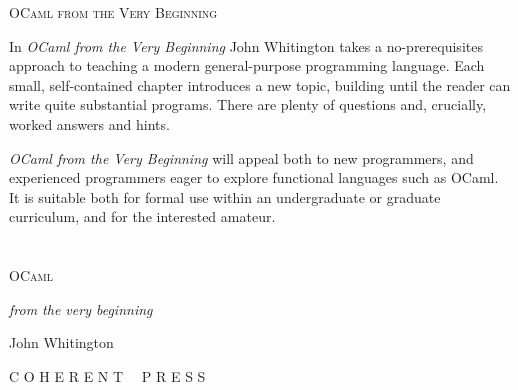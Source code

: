 \documentclass[]{book}
\begin{document}
\frontmatter

\thispagestyle{empty}

{\Large\scshape OCaml from the Very Beginning}

\vspace{16mm}

\begin{minipage}{5in}
\setlength{\parindent}{25pt}
\noindent In \textit{OCaml from the Very Beginning} John Whitington takes a no-prerequisites approach to teaching a modern general-purpose programming language. Each small, self-contained chapter introduces a new topic, building until the reader can write quite substantial programs. There are plenty of questions and, crucially, worked answers and hints.

\textit{OCaml from the Very Beginning} will appeal both to new programmers, and experienced programmers eager to explore functional languages such as OCaml. It is suitable both for formal use within an undergraduate or graduate curriculum, and for the interested amateur.

\vspace{8mm}

\end{minipage}


\cleardoublepage %
\chapter*{} %

\thispagestyle{empty}

\begin{center}
\vphantom{a}%

\vspace{50mm}

{\Huge\scshape OCaml

\textit{\LARGE from the very beginning}

}

\vspace{20mm}

{John Whitington}

\vspace{85mm}

{\scshape C O H E R E N T \ \ P R E S S}
\end{center}
\end{document}
